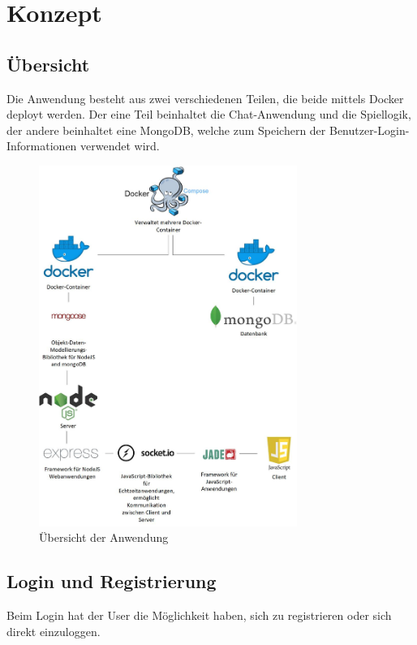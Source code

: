 
\chapter{Konzept}\label{cha:Konzept}
\section{Übersicht}\label{sec:Übersicht}
Die Anwendung besteht aus zwei verschiedenen Teilen, die beide mittels Docker deployt werden. 
Der eine Teil beinhaltet die Chat-Anwendung und die Spiellogik, der andere beinhaltet eine MongoDB, welche zum Speichern der Benutzer-Login-Informationen verwendet wird. 

\begin{figure}[H]
\centering
\includegraphics[width=0.75\textwidth]{images/uebersicht.jpg}
\caption{Übersicht der Anwendung}
\end{figure}


\section{Login und Registrierung}\label{sec:Login}
Beim Login hat der User die Möglichkeit haben, sich zu registrieren oder sich direkt einzuloggen. 


